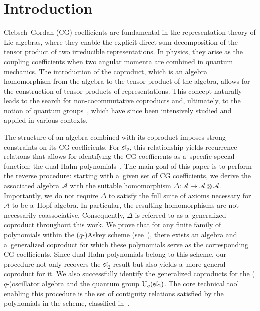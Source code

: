 \documentclass[pdftex]{sigma}
\numberwithin{equation}{section}
\theoremstyle{definition}
\begin{document}


\section{Introduction}

Clebsch--Gordan (CG) coefficients are fundamental in the representation theory of Lie algebras, where they enable the explicit direct sum decomposition of the tensor product of two irreducible representations. In physics, they arise as the coupling coefficients when two angular momenta are combined in quantum mechanics. The introduction of the coproduct, which is an algebra homomorphism from the algebra to the tensor product of the algebra, allows for the construction of tensor products of representations. This concept naturally leads to the search for non-cocommutative coproducts and, ultimately, to the notion of quantum groups~\cite{Drin1, Drin2}, which have since been intensively studied and applied in various contexts.

The structure of an algebra combined with its coproduct imposes strong constraints on its CG coefficients. For $\mathfrak{sl}_2$, this relationship yields recurrence relations that allows for identifying the CG coefficients as a~specific special function: the dual Hahn polynomials~\cite{Koor,Racah}.
The main goal of this paper is to perform the reverse procedure: starting with a~given set of CG coefficients, we derive the associated algebra $\mathcal{A}$ with the suitable homomorphism $\Delta\colon \mathcal{A}\to \mathcal{A}\otimes \mathcal{A}$.
Importantly, we do not require $\Delta$ to satisfy the full suite of axioms necessary for $\mathcal{A}$ to be a~Hopf algebra. In particular, the resulting homomorphisms are not necessarily coassociative. Consequently, $\Delta$ is referred to as a~generalized coproduct throughout this work.
 We prove that for any finite family of polynomials within the ($q$-)Askey scheme (see~\cite{KLS10}), there exists an algebra and a~generalized coproduct for which these polynomials serve as the corresponding CG coefficients.
Since dual Hahn polynomials belong to this scheme, our procedure not only recovers the $\mathfrak{sl}_2$ result but also yields a~more general coproduct for it. We also successfully identify the generalized coproducts for the ($q$-)oscillator algebra and the quantum group ${\rm U}_q(\mathfrak{sl}_2)$. The core technical tool enabling this procedure is the set of contiguity relations satisfied by the polynomials in the scheme, classified in~\cite{contiguity}.
\end{document}
